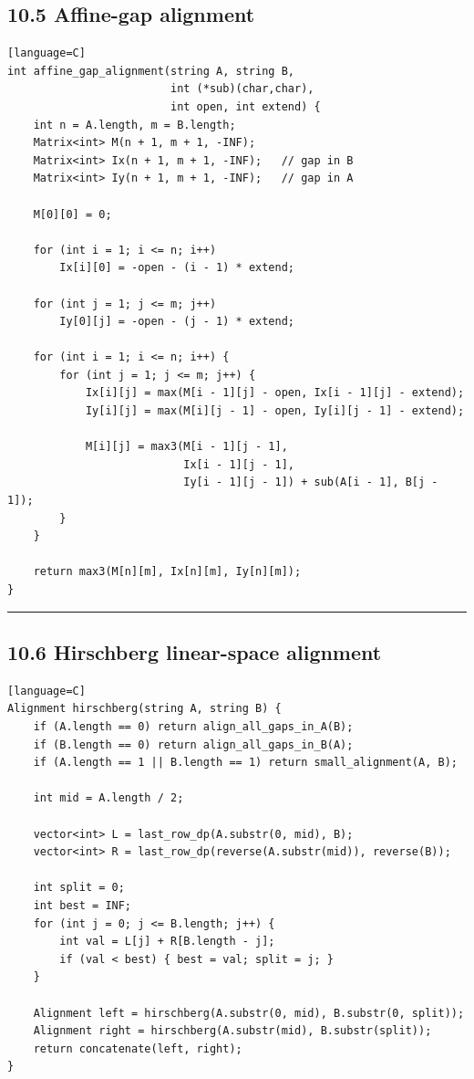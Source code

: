 \documentclass[11pt]{article}
\begin{document}
\subsection{10.5 Affine-gap alignment}\label{affine-gap-alignment}

\begin{verbatim}[language=C]
int affine_gap_alignment(string A, string B,
                         int (*sub)(char,char),
                         int open, int extend) {
    int n = A.length, m = B.length;
    Matrix<int> M(n + 1, m + 1, -INF);
    Matrix<int> Ix(n + 1, m + 1, -INF);   // gap in B
    Matrix<int> Iy(n + 1, m + 1, -INF);   // gap in A

    M[0][0] = 0;

    for (int i = 1; i <= n; i++)
        Ix[i][0] = -open - (i - 1) * extend;

    for (int j = 1; j <= m; j++)
        Iy[0][j] = -open - (j - 1) * extend;

    for (int i = 1; i <= n; i++) {
        for (int j = 1; j <= m; j++) {
            Ix[i][j] = max(M[i - 1][j] - open, Ix[i - 1][j] - extend);
            Iy[i][j] = max(M[i][j - 1] - open, Iy[i][j - 1] - extend);

            M[i][j] = max3(M[i - 1][j - 1],
                           Ix[i - 1][j - 1],
                           Iy[i - 1][j - 1]) + sub(A[i - 1], B[j - 1]);
        }
    }

    return max3(M[n][m], Ix[n][m], Iy[n][m]);
}
\end{verbatim}

\begin{center}\rule{0.5\linewidth}{0.5pt}\end{center}

\subsection{10.6 Hirschberg linear-space alignment}\label{hirschberg-linear-space-alignment}

\begin{verbatim}[language=C]
Alignment hirschberg(string A, string B) {
    if (A.length == 0) return align_all_gaps_in_A(B);
    if (B.length == 0) return align_all_gaps_in_B(A);
    if (A.length == 1 || B.length == 1) return small_alignment(A, B);

    int mid = A.length / 2;

    vector<int> L = last_row_dp(A.substr(0, mid), B);
    vector<int> R = last_row_dp(reverse(A.substr(mid)), reverse(B));

    int split = 0;
    int best = INF;
    for (int j = 0; j <= B.length; j++) {
        int val = L[j] + R[B.length - j];
        if (val < best) { best = val; split = j; }
    }

    Alignment left = hirschberg(A.substr(0, mid), B.substr(0, split));
    Alignment right = hirschberg(A.substr(mid), B.substr(split));
    return concatenate(left, right);
}
\end{verbatim}
\end{document}
